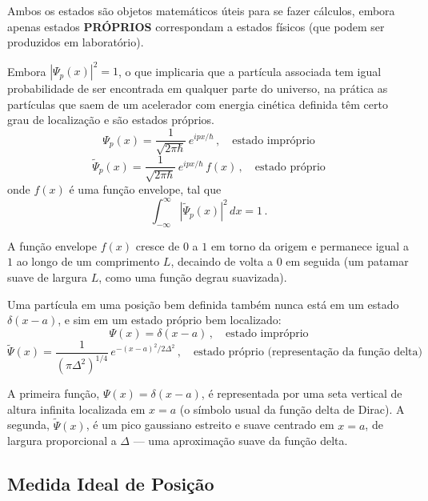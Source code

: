 Ambos os estados são objetos matemáticos úteis para se fazer cálculos, embora apenas estados \textbf{PRÓPRIOS} correspondam a estados físicos (que podem ser produzidos em laboratório).

Embora $|\Psi_p(x)|^2 = 1$, o que implicaria que a partícula associada tem igual probabilidade de ser encontrada em qualquer parte do universo, na prática as partículas que saem de um acelerador com energia cinética definida têm certo grau de localização e são estados próprios.
\begin{equation}
    \Psi_p(x) = \frac{1}{\sqrt{2\pi\hbar}} \, e^{ipx/\hbar} \, , \quad \text{estado impróprio}
\label{eq:aula13_psi_p_improprio}
\end{equation}
\begin{equation}
    \tilde{\Psi}_p(x) = \frac{1}{\sqrt{2\pi\hbar}} \, e^{ipx/\hbar} \, f(x) \, , \quad \text{estado próprio}
\label{eq:aula13_psi_p_proprio}
\end{equation}
onde $f(x)$ é uma função envelope, tal que
\begin{equation}
    \int_{-\infty}^{\infty} |\tilde{\Psi}_p(x)|^2 \, dx = 1 \, .
\label{eq:aula13_norm_proprio}
\end{equation}

A função envelope $f(x)$ cresce de $0$ a $1$ em torno da origem e permanece igual a $1$ ao longo de um comprimento $L$, decaindo de volta a $0$ em seguida (um patamar suave de largura $L$, como uma função degrau suavizada).

Uma partícula em uma posição bem definida também nunca está em um estado $\delta(x-a)$, e sim em um estado próprio bem localizado:
\begin{equation}
    \Psi(x) = \delta(x-a) \, , \quad \text{estado impróprio}
\label{eq:aula13_delta_improprio}
\end{equation}
\begin{equation}
    \tilde{\Psi}(x) = \frac{1}{(\pi\Delta^2)^{1/4}} \, e^{-(x-a)^2/2\Delta^2} \, , \quad \text{estado próprio (representação da função delta)}
\label{eq:aula13_gaussiana_proprio}
\end{equation}

A primeira função, $\Psi(x) = \delta(x-a)$, é representada por uma seta vertical de altura infinita localizada em $x=a$ (o símbolo usual da função delta de Dirac). A segunda, $\tilde{\Psi}(x)$, é um pico gaussiano estreito e suave centrado em $x=a$, de largura proporcional a $\Delta$ — uma aproximação suave da função delta.

\subsection*{Medida Ideal de Posição}

